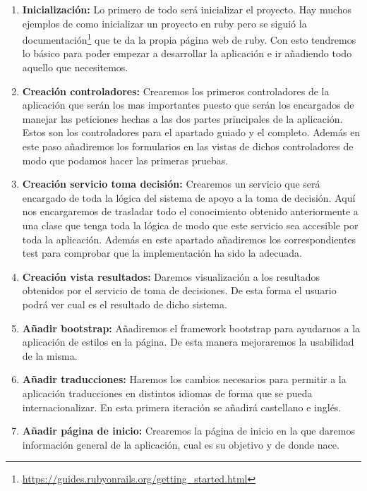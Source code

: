 \begin{enumerate}
  \item \textbf{Inicialización:} Lo primero de todo será inicializar el proyecto.
    Hay muchos ejemplos de como inicializar un proyecto en ruby pero se siguió
    la documentación\footnote{\url{https://guides.rubyonrails.org/getting_started.html}} que te da la propia página web de ruby. Con esto tendremos
    lo básico para poder empezar a desarrollar la aplicación e ir añadiendo todo
    aquello que necesitemos.

  \item \textbf{Creación controladores:} Crearemos los primeros controladores de
    la aplicación que serán los mas importantes puesto que serán los encargados
    de manejar las peticiones hechas a las dos partes principales de la aplicación.
    Estos son los controladores para el apartado guiado y el completo. Además
    en este paso añadiremos los formularios en las vistas de dichos controladores
    de modo que podamos hacer las primeras pruebas.

  \item \textbf{Creación servicio toma decisión:} Crearemos un servicio que será
    encargado de toda la lógica del sistema de apoyo a la toma de decisión. Aquí
    nos encargaremos de trasladar todo el conocimiento obtenido anteriormente
    a una clase que tenga toda la lógica de modo que este servicio sea accesible
    por toda la aplicación. Además en este apartado añadiremos los correspondientes
    test para comprobar que la implementación ha sido la adecuada.

  \item \textbf{Creación vista resultados:} Daremos visualización a los resultados
    obtenidos por el servicio de toma de decisiones. De esta forma el usuario podrá
    ver cual es el resultado de dicho sistema.

  \item \textbf{Añadir bootstrap:} Añadiremos el framework bootstrap para ayudarnos
    a la aplicación de estilos en la página. De esta manera mejoraremos la usabilidad de la misma.

  \item \textbf{Añadir traducciones:} Haremos los cambios necesarios para permitir
    a la aplicación traducciones en distintos idiomas de forma que se pueda
    internacionalizar. En esta primera iteración se añadirá castellano e inglés.

  \item \textbf{Añadir página de inicio:} Crearemos la página de inicio en la que
    daremos información general de la aplicación, cual es su objetivo y de donde nace.


\end{enumerate}
